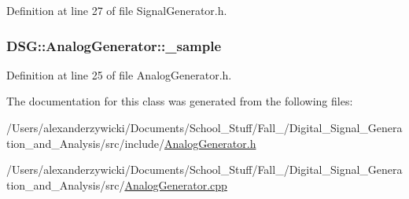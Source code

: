 Definition at line 27 of file Signal\+Generator.\+h.

\hypertarget{classDSG_1_1AnalogGenerator_ac88ad591cac37f636c2f7b460480bef9}{
\subsubsection[{\+\_\+sample}]{ D\+S\+G\+::\+Analog\+Generator\+::\+\_\+sample\hspace{0.3cm}{\ttfamily [protected]}}}\label{classDSG_1_1AnalogGenerator_ac88ad591cac37f636c2f7b460480bef9}


Definition at line 25 of file Analog\+Generator.\+h.



The documentation for this class was generated from the following files\+:\begin{DoxyCompactItemize}
\item 
/\+Users/alexanderzywicki/\+Documents/\+School\+\_\+\+Stuff/\+Fall\+\_/\+Digital\+\_\+\+Signal\+\_\+\+Generation\+\_\+and\+\_\+\+Analysis/src/include/\hyperlink{AnalogGenerator_8h}{Analog\+Generator.\+h}\item 
/\+Users/alexanderzywicki/\+Documents/\+School\+\_\+\+Stuff/\+Fall\+\_/\+Digital\+\_\+\+Signal\+\_\+\+Generation\+\_\+and\+\_\+\+Analysis/src/\hyperlink{AnalogGenerator_8cpp}{Analog\+Generator.\+cpp}\end{DoxyCompactItemize}
